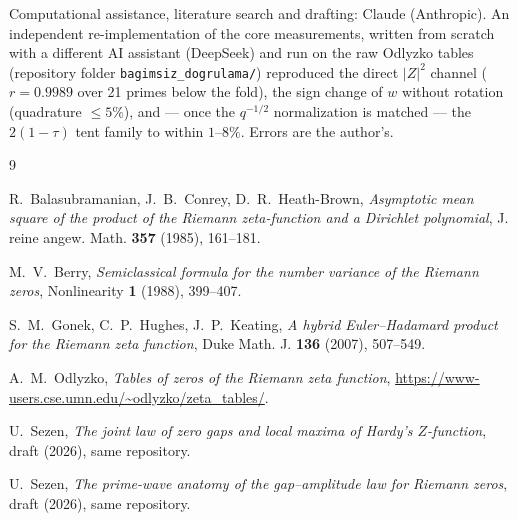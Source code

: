 \documentclass[12pt]{amsart}
\begin{document}
Computational assistance, literature search and drafting: Claude
(Anthropic). An independent re-implementation of the core measurements, written from
scratch with a different AI assistant (DeepSeek) and run on the raw
Odlyzko tables (repository folder \texttt{bagimsiz\_dogrulama/}) reproduced the direct $|Z|^2$ channel
($r = 0.9989$ over 21 primes below the fold), the sign change of $w$
without rotation (quadrature $\le 5\%$), and --- once the $q^{-1/2}$
normalization is matched --- the $2(1-\tau)$ tent family to within
$1$--$8\%$. Errors are the author's.

\begin{thebibliography}{9}

 R.~Balasubramanian, J.~B.~Conrey, D.~R.~Heath-Brown,
\emph{Asymptotic mean square of the product of the Riemann zeta-function
and a Dirichlet polynomial}, J. reine angew. Math. \textbf{357} (1985),
161--181.

 M.~V.~Berry, \emph{Semiclassical formula for the number
variance of the Riemann zeros}, Nonlinearity \textbf{1} (1988), 399--407.

 S.~M.~Gonek, C.~P.~Hughes, J.~P.~Keating, \emph{A hybrid
Euler--Hadamard product for the Riemann zeta function}, Duke Math. J.
\textbf{136} (2007), 507--549.

 A.~M.~Odlyzko, \emph{Tables of zeros of the
Riemann zeta function},
\url{https://www-users.cse.umn.edu/~odlyzko/zeta_tables/}.

 U.~Sezen, \emph{The joint law of zero gaps and local
maxima of Hardy's $Z$-function}, draft (2026), same repository.

 U.~Sezen, \emph{The prime-wave anatomy of the
gap--amplitude law for Riemann zeros}, draft (2026), same repository.

\end{thebibliography}
\end{document}
